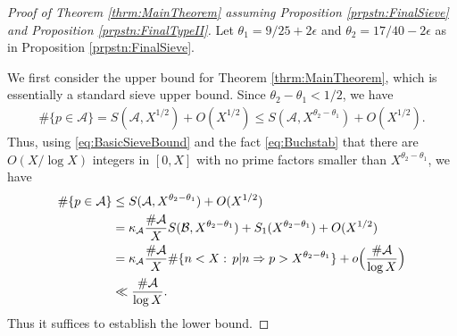 \documentclass[10pt]{amsart}
\theoremstyle{plain}
\numberwithin{sblmm}{thrm}
\numberwithin{equation}{section}
\begin{document}
\begin{proof}[Proof of Theorem \ref{thrm:MainTheorem} assuming Proposition \ref{prpstn:FinalSieve} and Proposition \ref{prpstn:FinalTypeII}]
%
%
Let $\theta_1=9/25+2\epsilon$ and $\theta_2=17/40-2\epsilon$ as in Proposition \ref{prpstn:FinalSieve}. 

We first consider the upper bound for Theorem \ref{thrm:MainTheorem}, which is essentially a standard sieve upper bound.  Since $\theta_2-\theta_1<1/2$, we have
\begin{align*}
\#\{p\in\mathcal{A}{}\}= S(\mathcal{A}{},X^{1/2})+O(X^{1/2})\le S(\mathcal{A}{},X^{\theta_2-\theta_1})+O(X^{1/2}).
\end{align*}
Thus, using \eqref{eq:BasicSieveBound} and the fact \eqref{eq:Buchstab} that there are $O(X/\log{X})$ integers in $[0,X]$ with no prime factors smaller than $X^{\theta_2-\theta_1}$, we have
\begin{align*}
\#\{p\in\mathcal{A}{}\}&\le S(\mathcal{A}{},X^{\theta_2-\theta_1})+O(X^{1/2})\\
&=\kappa_{\mathcal{A}}\frac{\#\mathcal{A}{}}{X}S(\mathcal{B}{},X^{\theta_2-\theta_1})+S_1(X^{\theta_2-\theta_1})+O(X^{1/2})\\
&=\kappa_{\mathcal{A}}\frac{\#\mathcal{A}{}}{X}\#\{n< X:\,p|n\Rightarrow p>X^{\theta_2-\theta_1}\}+o\Bigl(\frac{\#\mathcal{A}{}}{\log{X}}\Bigr)\\
&\ll \frac{\#\mathcal{A}{}}{\log{X}}.
\end{align*}
 Thus it suffices to establish the lower bound.


\end{proof}
\end{document}

